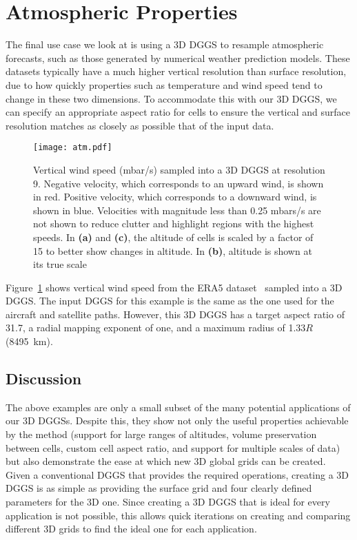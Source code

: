 \section{Atmospheric Properties}
The final use case we look at is using a 3D DGGS to resample atmospheric forecasts, such as those generated by numerical weather prediction models.
These datasets typically have a much higher vertical resolution than surface resolution, due to how quickly properties such as temperature and wind speed tend to change in these two dimensions.
To accommodate this with our 3D DGGS, we can specify an appropriate aspect ratio for cells to ensure the vertical and surface resolution matches as closely as possible that of the input data.


\begin{figure}[h]
	\centering
	\texttt{[image: atm.pdf]}
	\caption{Vertical wind speed (mbar/s) sampled into a 3D DGGS at resolution 9.
		Negative velocity, which corresponds to an upward wind, is shown in red.
		Positive velocity, which corresponds to a downward wind, is shown in blue.
		Velocities with magnitude less than 0.25 mbars/s are not shown to reduce clutter and highlight regions with the highest speeds.
		In \textbf{(a)} and \textbf{(c)}, the altitude of cells is scaled by a factor of 15 to better show changes in altitude.
		In \textbf{(b)}, altitude is shown at its true scale}
	\label{fig:atmosphere}
\end{figure}


Figure~\ref{fig:atmosphere} shows vertical wind speed from the ERA5 dataset~\cite{era5} sampled into a 3D DGGS.
The input DGGS for this example is the same as the one used for the aircraft and satellite paths.
However, this 3D DGGS has a target aspect ratio of 31.7, a radial mapping exponent of one, and a maximum radius of 1.33$R$ (8495~km).


\subsection{Discussion}
The above examples are only a small subset of the many potential applications of our 3D DGGSs.
Despite this, they show not only the useful properties achievable by the method (support for large ranges of altitudes, volume preservation between cells, custom cell aspect ratio, and support for multiple scales of data) but also demonstrate the ease at which new 3D global grids can be created.
Given a conventional DGGS that provides the required operations, creating a 3D DGGS is as simple as providing the surface grid and four clearly defined parameters for the 3D one.
Since creating a 3D DGGS that is ideal for every application is not possible, this allows quick iterations on creating and comparing different 3D grids to find the ideal one for each application.